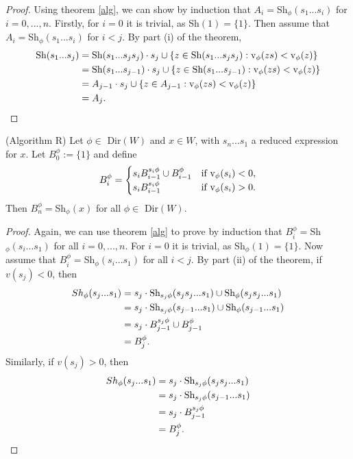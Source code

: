 \documentclass[11pt]{article}
\begin{document}
\begin{proof}
    Using theorem \ref{alg}, we can show by induction that $A_i=$Sh$_\phi(s_1...s_i)$ for $i=0,...,n$. Firstly, for $i=0$ it is trivial, as Sh$(1)=\{1\}$. Then assume that $A_i=$Sh$_\phi(s_1...s_i)$ for $i<j$. By part (i) of the theorem,\[\begin{aligned}
    \textnormal{Sh}(s_1...s_j)& = \textnormal{Sh}(s_1...s_js_j)\cdot s_j \cup \{z\in \textnormal{Sh}(s_1...s_js_j): \textnormal{v}_\phi(zs)<\textnormal{v}_\phi(z)\}\\
        & = \textnormal{Sh}(s_1...s_{j-1})\cdot s_j \cup \{z\in \textnormal{Sh}(s_1...s_{j-1}): \textnormal{v}_\phi(zs)<\textnormal{v}_\phi(z)\}\\
        & = A_{j-1}\cdot s_j \cup \{z\in A_{j-1}: \textnormal{v}_\phi(zs)<\textnormal{v}_\phi(z)\}\\
        & = A_j.
    \end{aligned}\]
\end{proof}

\begin{lemma} (Algorithm R)
    Let $\phi\in$ Dir$(W)$ and $x\in W$, with $s_n...s_1$ a reduced expression for $x$. Let $B_0^\phi:=\{1\}$ and define
    \[B_i^\phi = \begin{cases}
        s_iB_{i-1}^{s_i\phi}\cup B_{i-1}^\phi & \textnormal{if v}_\phi(s_i)<0,\\
        s_iB_{i-1}^{s_i\phi} & \textnormal{if v}_\phi(s_i)>0.
    \end{cases}\]
    Then $B^\phi_n=$Sh$_\phi(x)$ for all $\phi\in$ Dir$(W)$. 
\end{lemma}

\begin{proof}
    Again, we can use theorem \ref{alg} to prove by induction that $B^\phi_i=$Sh$_\phi(s_i...s_1)$ for all $i=0,...,n$. For $i=0$ it is trivial, as Sh$_\phi(1)=\{1\}$. Now assume that $B^\phi_i=$Sh$_\phi(s_i...s_1)$ for all $i<j$. By part (ii) of the theorem, if $v(s_j)<0$, then
    \[\begin{aligned}
        Sh_\phi(s_j...s_1)&=s_j\cdot \textnormal{Sh}_{s_j\phi}(s_js_j...s_1)\cup \textnormal{Sh}_\phi(s_js_j...s_1)\\
                        &=  s_j\cdot \textnormal{Sh}_{s_j\phi}(s_{j-1}...s_1)\cup \textnormal{Sh}_\phi(s_{j-1}...s_1)\\
                        &= s_j\cdot B^{s_j\phi}_{j-1}\cup B^{\phi}_{j-1}\\
                        &= B^\phi_j. 
    \end{aligned}\]
    Similarly, if $v(s_j)>0$, then
    \[\begin{aligned}
        Sh_\phi(s_j...s_1)& = s_j\cdot \textnormal{Sh}_{s_j\phi}(s_js_j...s_1)\\
                        & = s_j\cdot \textnormal{Sh}_{s_j\phi}(s_{j-1}...s_1)\\
                        & = s_j \cdot B^{s_j\phi}_{j-1}\\
                        & = B^{\phi}_{j}. 
    \end{aligned}\]
\end{proof}
\end{document}
